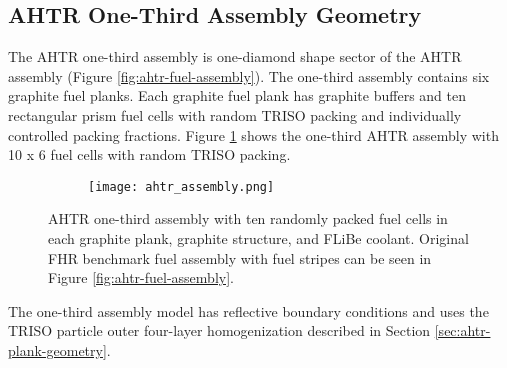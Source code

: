 \subsection{AHTR One-Third Assembly Geometry}
\label{sec:ahtr-assem-geometry}
The \gls{AHTR} one-third assembly is one-diamond shape sector of the \gls{AHTR} assembly
(Figure \ref{fig:ahtr-fuel-assembly}). 
The one-third assembly contains six graphite fuel planks.
Each graphite fuel plank has graphite buffers and ten rectangular prism fuel cells 
with random TRISO packing and individually controlled packing fractions. 
Figure \ref{fig:ahtr_assembly} shows the one-third \gls{AHTR} assembly with 10 x 6 
fuel cells with random \gls{TRISO} packing.
\begin{figure}[htbp]
    \centering
    \begin{subfigure}{.7\textwidth}
    \texttt{[image: ahtr\_assembly.png]}
    \end{subfigure}%
    \begin{subfigure}{.3\textwidth}
        \vspace{1cm}
    \end{subfigure}
    \caption{\acrfull{AHTR} one-third assembly with ten randomly packed fuel cells 
    in each graphite plank, graphite structure, and \gls{FLiBe} coolant. 
    Original \gls{FHR} benchmark fuel assembly with fuel 
    stripes can be seen in Figure \ref{fig:ahtr-fuel-assembly}.}
    \label{fig:ahtr_assembly}
\end{figure}
The one-third assembly model has reflective boundary conditions and  
uses the \gls{TRISO} particle outer four-layer 
homogenization described in Section \ref{sec:ahtr-plank-geometry}.
\pagebreak

